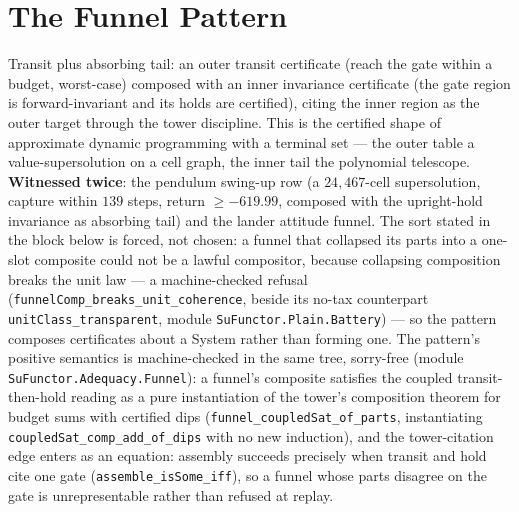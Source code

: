 

\section{The Funnel Pattern}
\label{sec:cp-funnel}

Transit plus absorbing tail: an outer transit certificate (reach the
gate within a budget, worst-case) composed with an inner invariance
certificate (the gate region is forward-invariant and its holds are
certified), citing the inner region as the outer target through the
tower discipline. This is the certified shape of approximate dynamic
programming with a terminal set --- the outer table a
value-supersolution on a cell graph, the inner tail the polynomial
telescope. \textbf{Witnessed twice}: the pendulum swing-up row
(a $24{,}467$-cell supersolution, capture within $139$ steps, return
$\ge -619.99$, composed with the upright-hold invariance as absorbing
tail) and the lander attitude funnel. The sort stated in the
block below is forced, not chosen: a funnel that collapsed its parts
into a one-slot composite could not be a lawful compositor, because
collapsing composition breaks the unit law --- a machine-checked
refusal (\texttt{funnelComp\_breaks\_unit\_coherence}, beside its
no-tax counterpart \texttt{unitClass\_transparent}, module
\texttt{SuFunctor.Plain.Battery}) --- so the pattern composes
certificates about a System rather than forming one. The pattern's
positive semantics is machine-checked in the same tree, sorry-free
(module \texttt{SuFunctor.Adequacy.Funnel}): a funnel's composite
satisfies the coupled transit-then-hold reading as a pure
instantiation of the tower's composition theorem for budget sums with
certified dips (\texttt{funnel\_coupledSat\_of\_parts}, instantiating
\texttt{coupledSat\_comp\_add\_of\_dips} with no new induction), and
the tower-citation edge enters as an equation: assembly succeeds
precisely when transit and hold cite one gate
(\texttt{assemble\_isSome\_iff}), so a funnel whose parts disagree on
the gate is unrepresentable rather than refused at replay.

